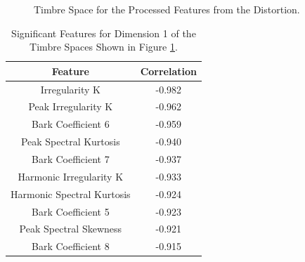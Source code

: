 	\begin{figure}[h!]
		\centering
		\qquad
		\caption{Timbre Space for the Processed Features from the Distortion.}
		\label{fig:DistortionProcessedMDSs}
	\end{figure}

	\begin{table}[h!]
		\centering
		\begin{tabular}{|c|c|}
			\hline
			\bf{Feature} & \bf{Correlation} \\
			\hline
			\hline
			Irregularity K & -0.982 \\
			\hline
			Peak Irregularity K & -0.962 \\
			\hline
			Bark Coefficient 6 & -0.959 \\
			\hline
			Peak Spectral Kurtosis & -0.940 \\
			\hline
			Bark Coefficient 7 & -0.937 \\
			\hline
			Harmonic Irregularity K & -0.933 \\
			\hline
			Harmonic Spectral Kurtosis & -0.924 \\
			\hline
			Bark Coefficient 5 & -0.923 \\
			\hline
			Peak Spectral Skewness & -0.921 \\
			\hline
			Bark Coefficient 8 & -0.915 \\
			\hline
		\end{tabular}
		\caption{Significant Features for Dimension 1 of the Timbre Spaces Shown in Figure 
			 \ref{fig:DistortionProcessedMDSs}.}
		\label{tab:DistortionProcessedFeaturesDim1}
	\end{table}

